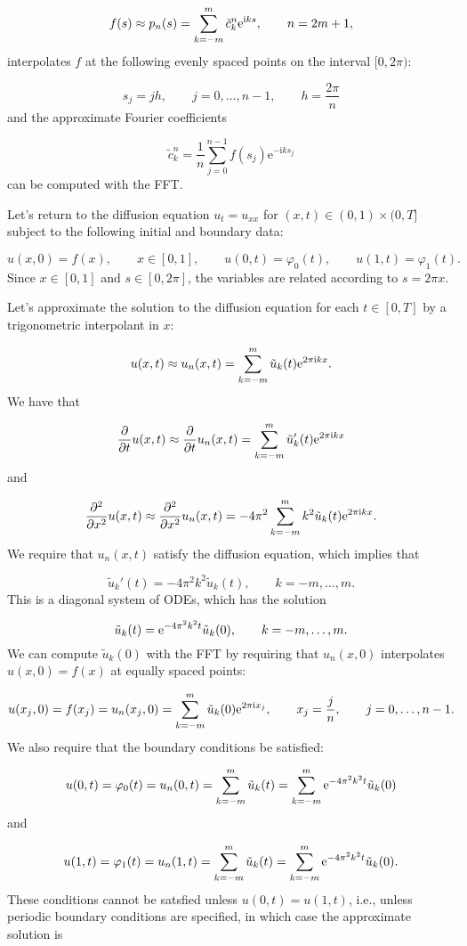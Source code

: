 \documentclass[12pt,landscape]{article}
\begin{document}
{\[
f(s) \approx p_n(s) = \sum_{k=-m}^{m}\tilde{c}^n_k {\rm e}^{{\rm i}ks}, \qquad n = 2m + 1, 
\]
interpolates $f$ at the following evenly spaced points on the interval $[0, 2\pi)$:

\[
s_j = j h,\qquad j = 0, \ldots, n-1, \qquad h = \frac{2\pi}{n}
\]
and the approximate Fourier coefficients

\[
\tilde{c}^n_k   =\frac{1}{n}\sum_{j = 0}^{n-1} f(s_j)\mathrm{e}^{-\mathrm{i}ks_j} 
\]
can be computed with the FFT.

Let's return to the diffusion equation $u_t = u_{xx}$ for $(x,t) \in (0,1)\times(0,T]$ subject to the following initial and boundary data:

\[
u(x,0) = f(x), \qquad x \in [0, 1], \qquad u(0,t) = \varphi_0(t), \qquad u(1,t) = \varphi_1(t).
\]
Since $x \in [0, 1]$ and $s \in [0, 2\pi]$, the variables are related according to $s = 2\pi x$.

Let's approximate the solution to the diffusion equation for each $t \in [0, T]$ by a trigonometric interpolant in $x$: 

\[
u(x,t) \approx u_n(x,t) = \sum_{k=-m}^{m} \tilde{u}_k(t) {\rm e}^{2\pi{\rm i}kx}.
\]
We have that

\[
\frac{\partial}{\partial t}u(x,t) \approx \frac{\partial}{\partial t} u_n(x,t) = \sum_{k=-m}^{m} \tilde{u}_k'(t) {\rm e}^{2\pi{\rm i}kx}
\]
and

\[
\frac{\partial^2}{\partial x^2}u(x,t) \approx \frac{\partial^2}{\partial x^2} u_n(x,t) = -4\pi^2\sum_{k=-m}^{m} k^2\tilde{u}_k(t) {\rm e}^{2\pi{\rm i}kx}.
\]
We require that $u_n(x,t)$ satisfy the diffusion equation, which implies that

\[
\tilde{u}_k'(t)  = -4\pi^2 k^2 \tilde{u}_k(t), \qquad k = -m, \ldots, m.
\]
This is a diagonal system of ODEs, which has the solution

\[
\tilde{u}_k(t) = {\rm e}^{-4\pi^2 k^2 t}\tilde{u}_k(0), \qquad k = -m, \ldots, m.
\]
We can compute $\tilde{u}_k(0)$ with the FFT by requiring that $u_n(x,0)$ interpolates $u(x,0) = f(x)$ at equally spaced points:

\[
u(x_j,0) = f(x_j) = u_n(x_j,0) = \sum_{k=-m}^{m} \tilde{u}_k(0) {\rm e}^{2\pi{\rm i}x_j}, \qquad x_j = \frac{j}{n}, \qquad j = 0, \ldots, n-1.
\]
We also require that the boundary conditions be satisfied:

\[
u(0,t) = \varphi_0(t) = u_n(0,t) = \sum_{k=-m}^{m}\tilde{u}_k(t) = \sum_{k=-m}^{m}{\rm e}^{-4\pi^2 k^2 t}\tilde{u}_k(0)
\]
and

\[
u(1,t) = \varphi_1(t) = u_n(1,t) = \sum_{k=-m}^{m}\tilde{u}_k(t) = \sum_{k=-m}^{m}{\rm e}^{-4\pi^2 k^2 t}\tilde{u}_k(0).
\]
These conditions cannot be satsfied unless $u(0,t) = u(1,t)$, i.e., unless periodic boundary conditions are specified, in which case the approximate solution is

}
\end{document}
